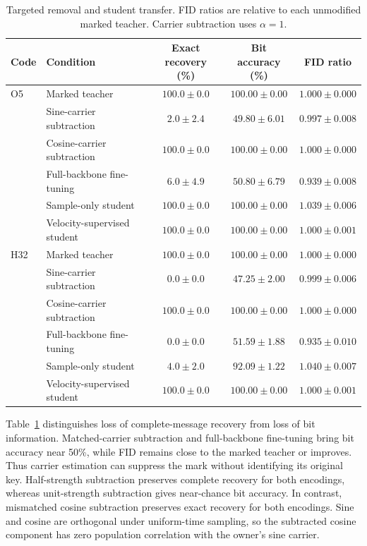 \documentclass[11pt]{article}
\begin{document}
\begin{table}[!htbp]
\centering
\caption{Targeted removal and student transfer. FID ratios are
relative to each unmodified marked teacher. Carrier subtraction uses
$\alpha=1$.}
\label{tab:removal-transfer}
\small
\setlength{\tabcolsep}{4pt}
\begin{tabular}{@{}llccc@{}}
\toprule
Code & Condition & \shortstack{Exact recovery\\(\%)} & \shortstack{Bit accuracy\\(\%)} & FID ratio \\
\midrule
O5 & Marked teacher & $100.0{\pm}0.0$ & $100.00{\pm}0.00$ & $1.000{\pm}0.000$ \\
& Sine-carrier subtraction & $2.0{\pm}2.4$ & $49.80{\pm}6.01$ & $0.997{\pm}0.008$ \\
& Cosine-carrier subtraction & $100.0{\pm}0.0$ & $100.00{\pm}0.00$ & $1.000{\pm}0.000$ \\
& Full-backbone fine-tuning & $6.0{\pm}4.9$ & $50.80{\pm}6.79$ & $0.939{\pm}0.008$ \\
& Sample-only student & $100.0{\pm}0.0$ & $100.00{\pm}0.00$ & $1.039{\pm}0.006$ \\
& Velocity-supervised student & $100.0{\pm}0.0$ & $100.00{\pm}0.00$ & $1.000{\pm}0.001$ \\
\midrule
H32 & Marked teacher & $100.0{\pm}0.0$ & $100.00{\pm}0.00$ & $1.000{\pm}0.000$ \\
& Sine-carrier subtraction & $0.0{\pm}0.0$ & $47.25{\pm}2.00$ & $0.999{\pm}0.006$ \\
& Cosine-carrier subtraction & $100.0{\pm}0.0$ & $100.00{\pm}0.00$ & $1.000{\pm}0.000$ \\
& Full-backbone fine-tuning & $0.0{\pm}0.0$ & $51.59{\pm}1.88$ & $0.935{\pm}0.010$ \\
& Sample-only student & $4.0{\pm}2.0$ & $92.09{\pm}1.22$ & $1.040{\pm}0.007$ \\
& Velocity-supervised student & $100.0{\pm}0.0$ & $100.00{\pm}0.00$ & $1.000{\pm}0.001$ \\
\bottomrule
\end{tabular}
\end{table}

Table~\ref{tab:removal-transfer} distinguishes loss of complete-message
recovery from loss of bit information. Matched-carrier subtraction and
full-backbone fine-tuning bring bit accuracy near 50\%, while FID
remains close to the marked teacher or improves. Thus carrier
estimation can suppress the mark without identifying its original
key. Half-strength subtraction preserves complete recovery for both
encodings, whereas unit-strength subtraction gives near-chance bit accuracy.
In contrast, mismatched cosine subtraction preserves exact recovery
for both encodings. Sine and cosine are orthogonal under uniform-time
sampling, so the subtracted cosine component has zero population
correlation with the owner's sine carrier.
\end{document}
